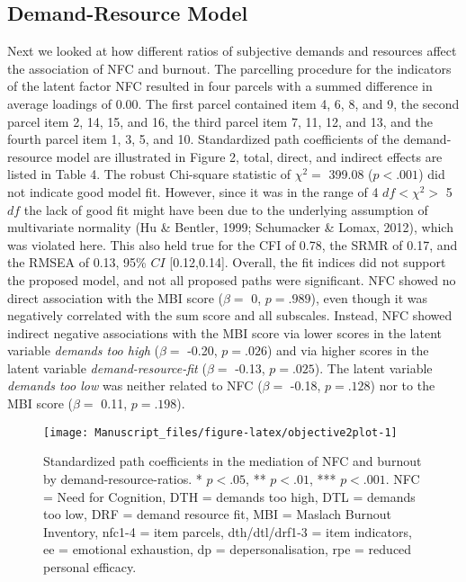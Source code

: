 \documentclass[
  english,
  man,floatsintext]{apa6}
\begin{document}
\hypertarget{demand-resource-model}{%
\subsection{Demand-Resource Model}\label{demand-resource-model}}

Next we looked at how different ratios of subjective demands and resources affect the association of NFC and burnout.
The parcelling procedure for the indicators of the latent factor NFC resulted in four parcels with a summed difference in average loadings of 0.00.
The first parcel contained item 4, 6, 8, and 9, the second parcel item 2, 14, 15, and 16, the third parcel item 7, 11, 12, and 13, and the fourth parcel item 1, 3, 5, and 10.
Standardized path coefficients of the demand-resource model are illustrated in Figure 2, total, direct, and indirect effects are listed in Table 4.
The robust Chi-square statistic of \(\chi^2=\) 399.08 (\(p < .001\)) did not indicate good model fit.
However, since it was in the range of 4 \(df<\chi^2>\) 5 \(df\) the lack of good fit might have been due to the underlying assumption of multivariate normality (Hu \& Bentler, 1999; Schumacker \& Lomax, 2012), which was violated here.
This also held true for the CFI of 0.78, the SRMR of 0.17, and the RMSEA of 0.13, 95\% \(CI\) {[}0.12,0.14{]}.
Overall, the fit indices did not support the proposed model, and not all proposed paths were significant.
NFC showed no direct association with the MBI score (\(\beta=\) 0, \(p=.989\)), even though it was negatively correlated with the sum score and all subscales.
Instead, NFC showed indirect negative associations with the MBI score via lower scores in the latent variable \emph{demands too high} (\(\beta=\) -0.20, \(p=.026\)) and via higher scores in the latent variable \emph{demand-resource-fit} (\(\beta=\) -0.13, \(p=.025\)).
The latent variable \emph{demands too low} was neither related to NFC (\(\beta=\) -0.18, \(p=.128\)) nor to the MBI score (\(\beta=\) 0.11, \(p=.198\)).

\begin{figure}[H]
\texttt{[image: Manuscript\_files/figure-latex/objective2plot-1]} \caption{Standardized path coefficients in the mediation of NFC and burnout by demand-resource-ratios. * $p<.05$, ** $p<.01$, *** $p<.001$. NFC = Need for Cognition, DTH = demands too high, DTL = demands too low, DRF = demand resource fit, MBI = Maslach Burnout Inventory, nfc1-4 = item parcels, dth/dtl/drf1-3 = item indicators, ee = emotional exhaustion, dp = depersonalisation, rpe = reduced personal efficacy.}\label{fig:objective2plot}
\end{figure}
\end{document}
